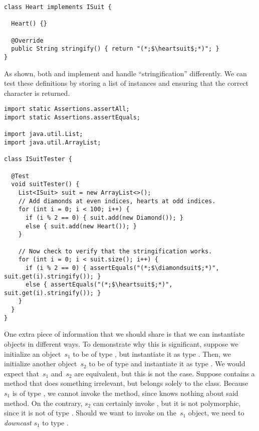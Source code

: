 \begin{lstlisting}[language=MyJava]
class Heart implements ISuit {
    
  Heart() {}

  @Override
  public String stringify() { return "(*;$\heartsuit$;*)"; }
}
\end{lstlisting}

As shown, both  and  implement  and handle ``stringification'' differently. We can test these definitions by storing a list of  instances and ensuring that the correct character is returned.

\begin{lstlisting}[language=MyJava]
import static Assertions.assertAll;
import static Assertions.assertEquals;

import java.util.List;
import java.util.ArrayList;

class ISuitTester {

  @Test
  void suitTester() {
    List<ISuit> suit = new ArrayList<>();
    // Add diamonds at even indices, hearts at odd indices.
    for (int i = 0; i < 100; i++) {
      if (i % 2 == 0) { suit.add(new Diamond()); }
      else { suit.add(new Heart()); }
    }

    // Now check to verify that the stringification works.
    for (int i = 0; i < suit.size(); i++) {
      if (i % 2 == 0) { assertEquals("(*;$\diamondsuit$;*)", suit.get(i).stringify()); }
      else { assertEquals("(*;$\heartsuit$;*)", suit.get(i).stringify()); }
    }
  }
}
\end{lstlisting}

One extra piece of information that we should share is that we can instantiate objects in different ways. 
To demonstrate why this is significant, suppose we initialize an object~$s_1$ to be of type , but instantiate it as type . 
Then, we initialize another object~$s_2$ to be of type  and instantiate it as type . 
We would expect that~$s_1$ and~$s_2$ are equivalent, but this is not the case. 
Suppose  contains a method  that does something irrelevant, but belongs solely to the  class. 
Because~$s_1$ is of type , we cannot invoke the  method, since  knows nothing about said method. 
On the contrary, $s_2$ can certainly invoke , but it is not polymorphic, since it is not of type . 
Should we want to invoke  on the~$s_1$ object, we need to \emph{downcast} $s_1$ to type .

